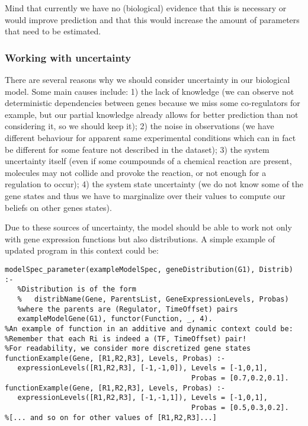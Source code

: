 \documentclass{article}
\begin{document}
Mind that currently we have no (biological) evidence that this is necessary or would improve prediction and that this would increase the amount of parameters that need to be estimated.
\subsubsection{Working with uncertainty}\label{sec:uncertainty}

There are several reasons why we should consider uncertainty in our biological model. Some main causes include: 1) the lack of knowledge (we can observe not deterministic dependencies between genes because we miss some co-regulators for example, but our partial knowledge already allows for better prediction than not considering it, so we should keep it); 2) the noise in observations (we have different behaviour for apparent same experimental conditions which can in fact be different for some feature not described in the dataset); 3) the system uncertainty itself (even if some coumpounds of a chemical reaction are present, molecules may not collide and provoke the reaction, or not enough for a regulation to occur); 4) the system state uncertainty (we do not know some of the gene states and thus we have to marginalize over their values to compute our beliefs on other genes states). 

Due to these sources of uncertainty, the model should be able to work not only with gene expression functions but also distributions. A simple example of updated program in this context could be:
\begin{verbatim}
modelSpec_parameter(exampleModelSpec, geneDistribution(G1), Distrib) :-
   %Distribution is of the form 
   %   distribName(Gene, ParentsList, GeneExpressionLevels, Probas) 
   %where the parents are (Regulator, TimeOffset) pairs
   exampleModelGene(G1), functor(Function, _, 4).
%An example of function in an additive and dynamic context could be:
%Remember that each Ri is indeed a (TF, TimeOffset) pair!
%For readability, we consider more discretized gene states
functionExample(Gene, [R1,R2,R3], Levels, Probas) :- 
   expressionLevels([R1,R2,R3], [-1,-1,0]), Levels = [-1,0,1], 
                                            Probas = [0.7,0.2,0.1].
functionExample(Gene, [R1,R2,R3], Levels, Probas) :- 
   expressionLevels([R1,R2,R3], [-1,-1,1]), Levels = [-1,0,1], 
                                            Probas = [0.5,0.3,0.2].
%[... and so on for other values of [R1,R2,R3]...]
\end{verbatim}
\end{document}
